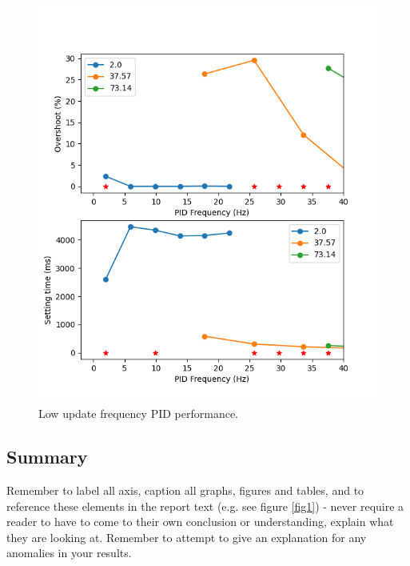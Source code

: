 \documentclass[conference]{IEEEtran}
\begin{document}
\begin{itemize}
\begin{figure}[htbp]
        \centerline{\includegraphics[width=\linewidth,height = 0.3\textheight]{Report/Pic/ResultLowFrequency.png}}
        \caption{Low update frequency PID performance.}
        \label{fig_FrequencyRange}
        \end{figure}
\end{itemize}
\subsection{Summary}

Remember to label all axis, caption all graphs, figures and tables, and to reference these elements in the report text (e.g. see figure \ref{fig1}) - never require a reader to have to come to their own conclusion or understanding, explain what they are looking at.  Remember to attempt to give an explanation for any anomalies in your results.  
\end{document}
